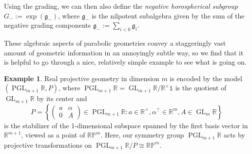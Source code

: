 \documentclass[12pt,a4paper]{amsart}
\theoremstyle{definition}
\newtheorem{example}[theorem]{Example}
\DeclareMathOperator{\GLin}{GL}
\DeclareMathOperator{\PGL}{PGL}
\begin{document}
Using the grading, we can then also define the \emph{negative horospherical subgroup} $G_-:=\exp(\mathfrak{g}_-)$, where $\mathfrak{g}_-$ is the nilpotent subalgebra given by the sum of the negative grading components $\mathfrak{g}_-:=\sum_{i<0}\mathfrak{g}_i$.

These algebraic aspects of parabolic geometries convey a staggeringly vast amount of geometric information in an annoyingly subtle way, so we find that it is helpful to go through a nice, relatively simple example to see what is going on.

\begin{example}Real projective geometry in dimension $m$ is encoded by the model $(\PGL_{m+1}\mathbb{R},P)$, where $\PGL_{m+1}\mathbb{R}\!=\!\GLin_{m+1}\mathbb{R}/\mathbb{R}^\times\mathds{1}$ is the quotient of $\GLin_{m+1}\mathbb{R}$ by its center and
\[P=\left\{\begin{pmatrix}a & \alpha \\ 0 & A\end{pmatrix}\in\PGL_{m+1}\mathbb{R}:a\in\mathbb{R}^\times, \alpha^\top\in\mathbb{R}^m, A\in\GLin_m\mathbb{R}\right\}\]
is the stabilizer of the 1-dimensional subspace spanned by the first basis vector in $\mathbb{R}^{m+1}$, viewed as a point of $\mathbb{RP}^m$. Here, our symmetry group $\PGL_{m+1}\mathbb{R}$ acts by projective transformations on $\PGL_{m+1}\mathbb{R}/P\cong\mathbb{RP}^m$.
\end{example}
\end{document}
